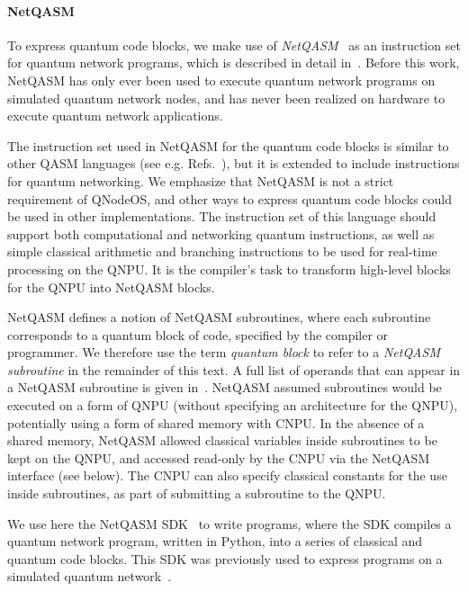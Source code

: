 \paragraph{NetQASM} To express quantum code blocks, we make use of \emph{\ac{NetQASM}}~\cite{dahlberg_2022_netqasm} as an instruction set for quantum network programs, which is described in detail in~\cite{dahlberg_2022_netqasm}. 
Before this work, \ac{NetQASM} has only ever been used to execute quantum network programs on simulated quantum network nodes, and has never been realized on hardware to execute quantum network applications.

The instruction set used in \ac{NetQASM} for the quantum code blocks is similar to other \ac{QASM} languages (see e.g. Refs.~\cite{cross_2017_qasm,khammassi_2018_cqasm,fu_2019_eqasm}), but it is extended to include instructions for quantum networking. We emphasize that \ac{NetQASM} is not a strict requirement of \ac{QNodeOS}, and other ways to express quantum code blocks could be used in other implementations. The instruction set of this language should support both computational and networking quantum instructions, as well as simple classical arithmetic and branching instructions to be used for real-time processing on the \ac{QNPU}. It is the compiler's task to transform high-level blocks for the \ac{QNPU} into \ac{NetQASM} blocks. 

\ac{NetQASM} defines a notion of \ac{NetQASM} subroutines, where each subroutine corresponds to a quantum block of code, specified by the compiler or programmer. We therefore use the term \emph{quantum block} to refer to a \emph{NetQASM subroutine} in the remainder of this text. A full list of operands that can appear in a \ac{NetQASM} subroutine is given in~\cite[Appendix B]{dahlberg_2022_netqasm}. \ac{NetQASM} assumed subroutines would be executed on a form of \ac{QNPU} (without specifying an architecture for the \ac{QNPU}), potentially using a form of shared memory with \ac{CNPU}. In the absence of a shared memory, \ac{NetQASM} allowed classical variables inside subroutines to be kept on the \ac{QNPU}, and accessed read-only by the \ac{CNPU} via the \ac{NetQASM} interface (see below). The \ac{CNPU} can also specify classical constants for the use inside subroutines, as part of submitting a subroutine to the \ac{QNPU}.

We use here the \ac{NetQASM} \ac{SDK}~\cite{netqasm_sdk} to write programs, where the \ac{SDK} compiles a quantum network program, written in Python, into a series of classical and quantum code blocks. This \ac{SDK} was previously used to express programs on a simulated quantum network~\cite{squidASM}.

